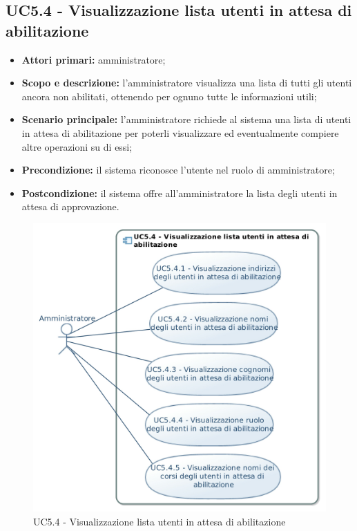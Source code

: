 \documentclass[AnalisiDeiRequisiti.tex]{subfiles}
\begin{document}
\subsection{UC5.4 - Visualizzazione lista utenti in attesa di abilitazione}
\begin{itemize}
	\item \textbf{Attori primari:} amministratore;
	\item \textbf{Scopo e descrizione:} l'amministratore visualizza una lista di tutti gli utenti ancora non abilitati, ottenendo per ognuno tutte le informazioni utili;
	\item \textbf{Scenario principale:} l'amministratore richiede al sistema una lista di utenti in attesa di abilitazione per poterli visualizzare ed eventualmente compiere altre operazioni su di essi;
	\item \textbf{Precondizione:} il sistema riconosce l'utente nel ruolo di amministratore; 
	\item \textbf{Postcondizione:} il sistema offre all'amministratore la lista degli utenti in attesa di approvazione.
\end{itemize}
\begin{figure}[H]
	\centering
	\includegraphics[width=0.8\linewidth]{UC5_4.jpg}
	\caption{UC5.4 - Visualizzazione lista utenti in attesa di abilitazione}
	\label{fig:UC5.4 - Visualizzazione lista utenti in attesa di abilitazione}
\end{figure}
\end{document}
